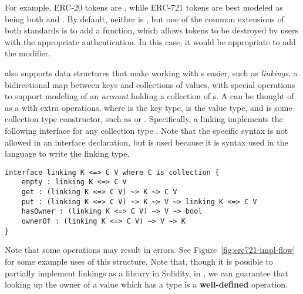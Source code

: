\documentclass[dvipsnames, usenames, sigconf]{acmart}
\begin{document}
For example, ERC-20 tokens are , while ERC-721 tokens are best modeled as being both  and .
By default, neither is , but one of the common extensions of both standards is to add a  function, which allows tokens to be destroyed by users with the appropriate authentication.
In this case, it would be appropriate to add the  modifier.

\langName also supports data structures that make working with \assetTxt{}s easier, such as \emph{linkings}, a bidirectional map between keys and collections of values, with special operations to support modeling of an \emph{account} holding a collection of \assetTxt{}s.
A  can be thought of as a  with extra operations, where  is the key type,  is the value type, and  is some collection type constructor, such as  or .
Specifically, a linking implements the following interface for any collection type .
Note that the specific syntax is not allowed in an interface declaration, but is used because it is syntax used in the language to write the linking type.
\begin{lstlisting}[language=flow]
interface linking K <=> C V where C is collection {
    empty : linking K <=> C V
    get : (linking K <=> C V) ~> K ~> C V
    put : (linking K <=> C V) ~> K ~> V ~> linking K <=> C V
    hasOwner : (linking K <=> C V) ~> V ~> bool
    ownerOf : (linking K <=> C V) ~> V ~> K
}
\end{lstlisting}
Note that some operations may result in errors. %
See Figure~\ref{fig:erc721-impl-flow} for some example uses of this structure.
Note that, though it is possible to partially implement linkings as a library in Solidity, in \langName, we can guarantee that looking up the owner of a value which has a  type is a \textbf{well-defined} operation.
\end{document}
